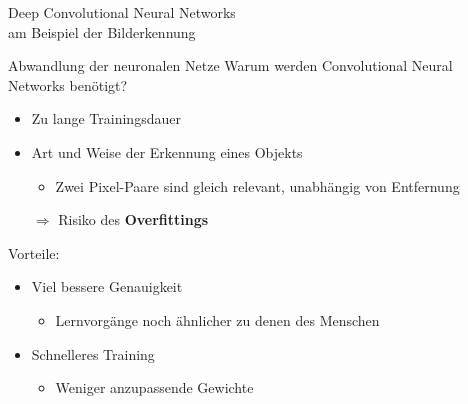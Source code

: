 \documentclass{beamer}
\begin{document}
\begin{frame}[plain,c]
\begin{center}
\Huge \color{presentationRed}Deep Convolutional Neural Networks\\[20pt]
\large \color{black}am Beispiel der Bilderkennung
\end{center}
\end{frame}

\begin{frame}[t]{Abwandlung der neuronalen Netze}
Warum werden Convolutional Neural Networks benötigt?
\begin{itemize}
\item Zu lange Trainingsdauer
\item Art und Weise der Erkennung eines Objekts
\begin{itemize}
\item Zwei Pixel-Paare sind gleich relevant, unabhängig von Entfernung
\end{itemize}
\item[\color{presentationRed}$\Rightarrow$] Risiko des \textbf{Overfittings}
\end{itemize}
Vorteile:
\begin{itemize}
\item Viel bessere Genauigkeit
\begin{itemize}
\item Lernvorgänge noch ähnlicher zu denen des Menschen
\end{itemize}
\item Schnelleres Training
\begin{itemize}
\item Weniger anzupassende Gewichte
\end{itemize}
\end{itemize}
\end{frame}
\end{document}
